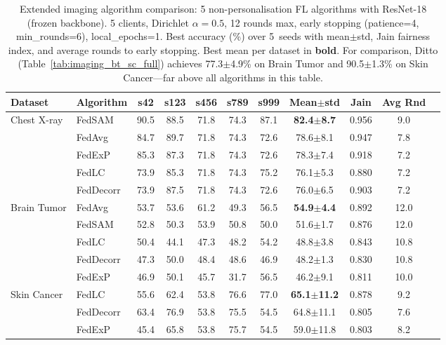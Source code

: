 \documentclass[conference,a4paper]{IEEEtran}
\begin{document}
\begin{table}[htbp]
\centering
\caption{Extended imaging algorithm comparison: 5 non-personalisation FL algorithms with ResNet-18 (frozen backbone). 5 clients, Dirichlet $\alpha{=}0.5$, 12 rounds max, early stopping (patience=4, min\_rounds=6), local\_epochs=1. Best accuracy (\%) over 5~seeds with mean$\pm$std, Jain fairness index, and average rounds to early stopping. Best mean per dataset in \textbf{bold}. For comparison, Ditto (Table~\ref{tab:imaging_bt_sc_full}) achieves 77.3$\pm$4.9\% on Brain Tumor and 90.5$\pm$1.3\% on Skin Cancer---far above all algorithms in this table.}
\label{tab:imaging_extended_algos}
\small
\begin{tabular}{llccccccccc}
\toprule
\textbf{Dataset} & \textbf{Algorithm} & \textbf{s42} & \textbf{s123} & \textbf{s456} & \textbf{s789} & \textbf{s999} & \textbf{Mean$\pm$std} & \textbf{Jain} & \textbf{Avg Rnd} \\
\midrule
\multirow{5}{*}{Chest X-ray}
 & FedSAM & 90.5 & 88.5 & 71.8 & 74.3 & 87.1 & \textbf{82.4$\pm$8.7} & 0.956 & 9.0 \\
 & FedAvg & 84.7 & 89.7 & 71.8 & 74.3 & 72.6 & 78.6$\pm$8.1 & 0.947 & 7.8 \\
 & FedExP & 85.3 & 87.3 & 71.8 & 74.3 & 72.6 & 78.3$\pm$7.4 & 0.918 & 7.2 \\
 & FedLC & 73.9 & 85.3 & 71.8 & 74.3 & 75.2 & 76.1$\pm$5.3 & 0.880 & 7.2 \\
 & FedDecorr & 73.9 & 87.5 & 71.8 & 74.3 & 72.6 & 76.0$\pm$6.5 & 0.903 & 7.2 \\
\midrule
\multirow{5}{*}{Brain Tumor}
 & FedAvg & 53.7 & 53.6 & 61.2 & 49.3 & 56.5 & \textbf{54.9$\pm$4.4} & 0.892 & 12.0 \\
 & FedSAM & 52.8 & 50.3 & 53.9 & 50.8 & 50.0 & 51.6$\pm$1.7 & 0.876 & 12.0 \\
 & FedLC & 50.4 & 44.1 & 47.3 & 48.2 & 54.2 & 48.8$\pm$3.8 & 0.843 & 10.8 \\
 & FedDecorr & 47.3 & 50.0 & 48.4 & 48.6 & 46.9 & 48.2$\pm$1.3 & 0.830 & 10.8 \\
 & FedExP & 46.9 & 50.1 & 45.7 & 31.7 & 56.5 & 46.2$\pm$9.1 & 0.811 & 10.0 \\
\midrule
\multirow{5}{*}{Skin Cancer}
 & FedLC & 55.6 & 62.4 & 53.8 & 76.6 & 77.0 & \textbf{65.1$\pm$11.2} & 0.878 & 9.2 \\
 & FedDecorr & 63.4 & 76.9 & 53.8 & 75.5 & 54.5 & 64.8$\pm$11.1 & 0.805 & 7.6 \\
 & FedExP & 45.4 & 65.8 & 53.8 & 75.7 & 54.5 & 59.0$\pm$11.8 & 0.803 & 8.2 \\

\end{tabular}
\end{table}
\end{document}
